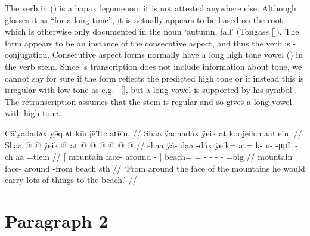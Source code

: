 The verb  in (\lastx) is a hapax legomenon: it is not attested anywhere else.
Although \citeauthor{swanton:1909} glosses it as “for a long time”, it is actually appears to be based on the root  which is otherwise only documented in the noun  ‘autumn, fall’ (Tongass  []).
The form appears to be an instance of the consecutive aspect, and thus the verb is -conjugation.
Consecutive aspect forms normally have a long high tone vowel () in the verb stem.
Since \citeauthor{swanton:1909}’s transcription does not include information about tone, we cannot say for sure if the form  reflects the predicted high tone or if instead this is irregular with low tone as e.g.\  [], but a long vowel is supported by his symbol .
The retranscription assumes that the stem is regular and so gives a long vowel with high tone.


\ex\label{ex:91-7-mountains-from-lug-lots-beach}%
%
\begingl
	\glpreamble	Cā′ỵadadᴀx ỵēq ᴀt kūdjē′łtc aʟē′n. //
	\glpreamble	Shaa ÿadaadáx̱ ÿeiḵ at koojeilch aatlein. //
	\gla	{} Shaa  @ {} @ {} {}
		ÿeiḵ @ at @  @ {} @ {} @ {} @ {} 
		 @ {} //
	\glb	{} shaa ÿá- daa -dáx̱ {}
		ÿeiḵ= at= k- u-  -μμL -ch
		aa =tlein //
	\glc	{}[ mountain face- around - {}]
		beach= = - -  - -
		 =big //
	\gld	{} mountain face- around -from {}
		beach\• sth\•  {} {} {} {}
		 {} //
	\glft	‘From around the face of the mountains he would carry lots of things to the beach.’
		//
\endgl
\xe

\section{Paragraph 2}\label{sec:91-para-2}

